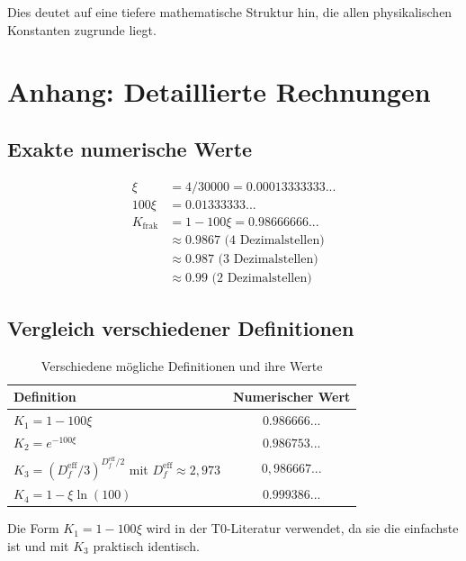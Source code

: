 	Dies deutet auf eine tiefere mathematische Struktur hin, die allen physikalischen Konstanten zugrunde liegt.
	
	\section{Anhang: Detaillierte Rechnungen}
	
	\subsection{Exakte numerische Werte}
	
	\begin{align}
		\xi &= 4/30000 = 0.00013333333... \\
		100\xi &= 0.01333333... \\
		K_{\text{frak}} &= 1 - 100\xi = 0.98666666... \\
		&\approx 0.9867 \text{ (4 Dezimalstellen)} \\
		&\approx 0.987 \text{ (3 Dezimalstellen)} \\
		&\approx 0.99 \text{ (2 Dezimalstellen)}
	\end{align}
	
	\subsection{Vergleich verschiedener Definitionen}
	
	\begin{table}[h]
		\centering
		\begin{tabular}{lc}
			\toprule
			\textbf{Definition} & \textbf{Numerischer Wert} \\
			\midrule
			$K_1 = 1 - 100\xi$ & $0.986666...$ \\
			$K_2 = e^{-100\xi}$ & $0.986753...$ \\
			$K_3 = (D_f^{\text{eff}}/3)^{D_f^{\text{eff}}/2}$ mit $D_f^{\text{eff}} \approx 2{,}973$ & $0{,}986667...$ \\
			$K_4 = 1 - \xi \ln(100)$ & $0.999386...$ \\
			\bottomrule
		\end{tabular}
		\caption{Verschiedene mögliche Definitionen und ihre Werte}
	\end{table}
	
	Die Form $K_1 = 1 - 100\xi$ wird in der T0-Literatur verwendet, da sie die einfachste ist und mit $K_3$ praktisch identisch.
	
	\appendix
	
